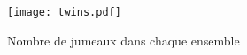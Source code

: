 \documentclass[../main.tex]{subfiles}
\begin{document}
    \label{sec:test2}

\begin{figure}[htbp]
	\centerline{\texttt{[image: twins.pdf]}}
\caption{Nombre de jumeaux dans chaque ensemble }
	\label{im:image4}
\end{figure}

\clearpage
\end{document}
